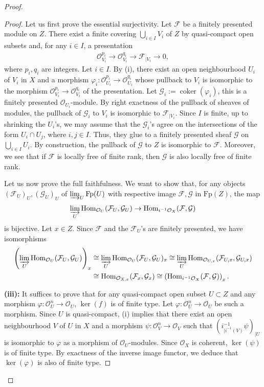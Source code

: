 \documentclass [11pt,reqno]{amsart}
\newcommand{\1}{\mathmybb{1}}
\def\cF{{\mathcal{F}}}
\def\cG{{\mathcal{G}}}
\def\cO{{\mathcal{O}}}
\def\coker{\operatorname{coker}}
\def\Hom{\operatorname{Hom}}
\begin{document}
\begin{proof}
\begin{proof}
\item[(ii):] Let us first prove the essential surjectivity. Let $\cF$ be a finitely presented module on $Z$. There exist a finite covering $\bigcup_{i\in I}V_{i}$ of $Z$ by quasi-compact open subsets and, for any $i\in I$, a presentation
\begin{align*}
\cO_{V_{i}}^{p_{i}} \to \cO_{V_{i}}^{q_{i}} \to \cF_{|V_{i}} \to 0,
\end{align*}
where $p_{i},q_{i}$ are integers. Let $i\in I$. By (i), there exist an open neighbourhood $U_{i}$ of $V_{i}$ in $X$ and a morphism $\varphi_{i}:\cO_{U_{i}}^{p_{i}}\to \cO_{U_{i}}^{q_{i}}$ whose pullback to $V_{i}$ is isomorphic to the morphism $\cO_{V_{i}}^{p_{i}} \to \cO_{V_{i}}^{q_{i}}$ of the presentation. Let $\cG_{i}:=\coker(\varphi_{i})$, this is a finitely presented $\cO_{U_{i}}$-module. By right exactness of the pullback of sheaves of modules, the pullback of $\cG_{i}$ to $V_{i}$ is isomorphic to $\cF_{|V_{i}}$. Since $I$ is finite, up to shrinking the $U_{i}$'s, we may assume that the $\cG_{i}$'s agree on the intersections of the form $U_{i}\cap U_{j}$, where $i,j\in I$. Thus, they glue to a finitely presented sheaf $\cG$ on $\bigcup_{i\in I}U_{i}$. By construction, the pullback of $\cG$ to $Z$ is isomorphic to $\cF$. Moreover, we see that if $\cF$ is locally free of finite rank, then $\cG$ is also locally free of finite rank. 

Let us now prove the full faithfulness. We want to show that, for any objects $(\cF_{U})_{U},(\cG_{U})_{U}$ of $\varinjlim_{U}\mathrm{Fp}(U)$ with respective image $\cF,\cG$ in $\mathrm{Fp}(Z)$, the map 
\begin{align*}
\displaystyle\varinjlim_{U}\Hom_{\cO_{U}}(\cF_{U},\cG_{U}) \to \Hom_{i^{-1}\cO_{X}}(\cF,\cG)
\end{align*}
is bijective. Let $x\in Z$. Since $\cF$ and the $\cF_{U}$'s are finitely presented, we have isomorphisms
\begin{align*}
\displaystyle\left(\varinjlim_{U}\Hom_{\cO_{U}}(\cF_{U},\cG_{U})\right)_{x} &\cong \varinjlim_{U}\Hom_{\cO_{U}}(\cF_{U},\cG_{U})_{x} \cong \varinjlim_{U}\Hom_{\cO_{U,x}}(\cF_{U,x},\cG_{U,x})\\ 
&\cong \Hom_{\cO_{X,x}}(\cF_{x},\cG_{x}) \cong  \left(\Hom_{i^{-1}\cO_{X}}(\cF,\cG)\right)_{x}.
\end{align*}

\textbf{(iii):} It suffices to prove that for any quasi-compact open subset $U\subset Z$ and any morphism $\varphi : \cO_{U}^{n}\to \cO_{U}$, $\ker(f)$ is of finite type. Let $\varphi:\cO_{U}^{n}\to \cO_{U}$ be such a morphism. Since $U$ is quasi-compact, (i) implies that there exist an open neighbourhood $V$ of $U$ in $X$ and a morphism $\psi:\cO_{V}^{n}\to \cO_{V}$ such that $(i_{|i^{-1}(V)}^{-1}\psi)_{|U}$ is isomorphic to $\varphi$ as a morphism of $\cO_{U}$-modules. Since $\cO_{X}$ is coherent, $\ker(\psi)$ is of finite type. By exactness of the inverse image functor, we deduce that $\ker(\varphi)$ is also of finite type.
\end{proof}


\end{proof}
\end{document}
